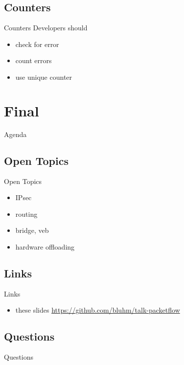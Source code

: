 \documentclass[14pt]{beamer}
\begin{document}
\subsection{Counters}
\begin{frame}{Counters}
Developers should
\begin{itemize}
  \item check for error
  \item count errors
  \item use unique counter
\end{itemize}
\end{frame}

\section{Final}
\begin{frame}{Agenda}
\tableofcontents[currentsection]
\end{frame}

\subsection{Open Topics}
\begin{frame}{Open Topics}
\begin{itemize}
  \item	IPsec
  \item routing
  \item	bridge, veb
  \item hardware offloading
\end{itemize}
\end{frame}

\subsection{Links}
\begin{frame}{Links}
\begin{itemize}
  \item these slides
    {\small \url{https://github.com/bluhm/talk-packetflow}}
\end{itemize}
\end{frame}

\subsection{Questions}
\begin{frame}{Questions}
\begin{center}
\end{center}
\end{frame}
\end{document}
